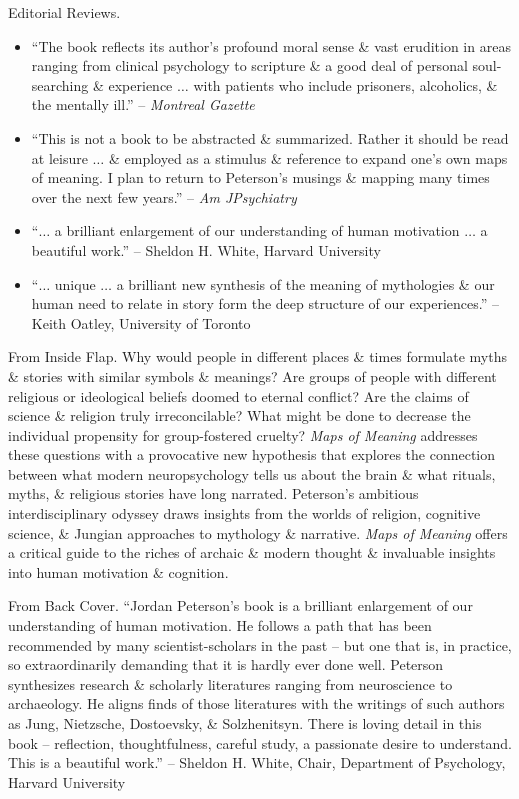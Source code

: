\documentclass{article}
\begin{document}
\begin{enumerate}
	{\sf Editorial Reviews.}
	\begin{itemize}
		\item ``The book reflects its author's profound moral sense \& vast erudition in areas ranging from clinical psychology to scripture \& a good deal of personal soul-searching \& experience $\ldots$ with patients who include prisoners, alcoholics, \& the mentally ill.'' -- {\it Montreal Gazette}
		\item ``This is not a book to be abstracted \& summarized. Rather it should be read at leisure $\ldots$ \& employed as a stimulus \& reference to expand one's own maps of meaning. I plan to return to {\sc Peterson}'s musings \& mapping many times over the next few years.'' -- {\it Am JPsychiatry}
		\item ``$\ldots$ a brilliant enlargement of our understanding of human motivation $\ldots$ a beautiful work.'' -- {\sc Sheldon H. White}, Harvard University
		\item ``$\ldots$ unique $\ldots$ a brilliant new synthesis of the meaning of mythologies \& our human need to relate in story form the deep structure of our experiences.'' -- {\sc Keith Oatley}, University of Toronto
	\end{itemize}
	{\sf From Inside Flap.} Why would people in different places \& times formulate myths \& stories with similar symbols \& meanings? Are groups of people with different religious or ideological beliefs doomed to eternal conflict? Are the claims of science \& religion truly irreconcilable? What might be done to decrease the individual propensity for group-fostered cruelty? {\it Maps of Meaning} addresses these questions with a provocative new hypothesis that explores the connection between what modern neuropsychology tells us about the brain \& what rituals, myths, \& religious stories have long narrated. {\sc Peterson}'s ambitious interdisciplinary odyssey draws insights from the worlds of religion, cognitive science, \& Jungian approaches to mythology \& narrative. {\it Maps of Meaning} offers a critical guide to the riches of archaic \& modern thought \& invaluable insights into human motivation \& cognition.
	
	{\sf From Back Cover.} ``{\sc Jordan Peterson}'s book is a brilliant enlargement of our understanding of human motivation. He follows a path that has been recommended by many scientist-scholars in the past -- but one that is, in practice, so extraordinarily demanding that it is hardly ever done well. {\sc Peterson} synthesizes research \& scholarly literatures ranging from neuroscience to archaeology. He aligns finds of those literatures with the writings of such authors as {\sc Jung, Nietzsche, Dostoevsky, \& Solzhenitsyn}. There is loving detail in this book -- reflection, thoughtfulness, careful study, a passionate desire to understand. This is a beautiful work.'' -- {\sc Sheldon H. White}, Chair, Department of Psychology, Harvard University
	

\end{enumerate}
\end{document}

